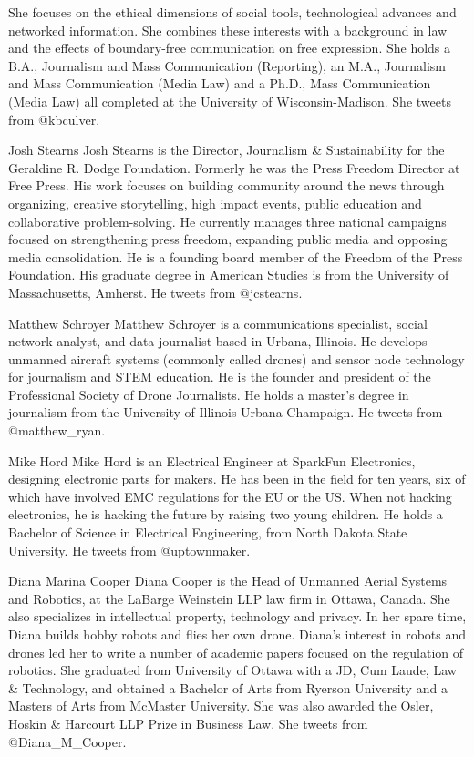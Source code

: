 She focuses on the ethical dimensions of social tools, technological
advances and networked information. She combines these interests with
a background in law and the effects of boundary-free communication on
free expression.
She holds a B.A., Journalism and Mass Communication (Reporting), an
M.A., Journalism and Mass Communication (Media Law) and a Ph.D.,
Mass Communication (Media Law) all completed at the University of
Wisconsin-Madison.
She tweets from @kbculver.


Josh Stearns
Josh Stearns is the Director, Journalism & Sustainability for the Geraldine
R. Dodge Foundation. Formerly he was the Press Freedom Director at Free
Press. His work focuses on building community around the news through
organizing, creative storytelling, high impact events, public education and
collaborative problem-solving.
He currently manages three national campaigns focused on strengthening
press freedom, expanding public media and opposing media consolidation.
He is a founding board member of the Freedom of the Press Foundation.
His graduate degree in American Studies is from the University of
Massachusetts, Amherst.
He tweets from @jcstearns.


Matthew Schroyer
Matthew Schroyer is a communications specialist, social network analyst,
and data journalist based in Urbana, Illinois.
He develops unmanned aircraft systems (commonly called drones) and sensor
node technology for journalism and STEM education. He is the founder
and president of the Professional Society of Drone Journalists.
He holds a master's degree in journalism from the University of Illinois
Urbana-Champaign.
He tweets from @matthew_ryan.


Mike Hord
Mike Hord is an Electrical Engineer at SparkFun Electronics, designing
electronic parts for makers. He has been in the field for ten years, six of
which have involved EMC regulations for the EU or the US.
When not hacking electronics, he is hacking the future by raising two
young children.
He holds a Bachelor of Science in Electrical Engineering, from North
Dakota State University.
He tweets from @uptownmaker.


Diana Marina Cooper
Diana Cooper is the Head of Unmanned Aerial Systems and Robotics, at the
LaBarge Weinstein LLP law firm in Ottawa, Canada.
She also specializes in intellectual property, technology and privacy. In her
spare time, Diana builds hobby robots and flies her own drone. Diana's
interest in robots and drones led her to write a number of academic papers
focused on the regulation of robotics.
She graduated from University of Ottawa with a JD, Cum Laude, Law &
Technology, and obtained a Bachelor of Arts from Ryerson University and a
Masters of Arts from McMaster University. She was also awarded the Osler,
Hoskin & Harcourt LLP Prize in Business Law.
She tweets from @Diana_M_Cooper.


